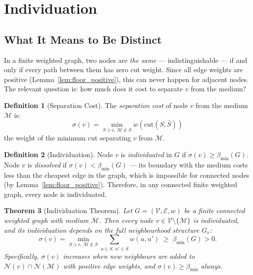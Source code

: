 \documentclass[12pt, a4paper]{article}
\theoremstyle{plain}
\newtheorem{theorem}{Theorem}[section]
\theoremstyle{definition}
\newtheorem{definition}[theorem]{Definition}
\theoremstyle{remark}
\newcommand{\cut}{\mathrm{cut}}
\newcommand{\med}{\mathcal{M}}
\newcommand{\Nbd}{\mathcal{N}}
\newcommand{\Ecal}{\mathcal{E}}
\newcommand{\Vcal}{\mathcal{V}}
\newcommand{\bmin}{\beta_{\min}}
\begin{document}
\section{Individuation}
\label{sec:individuation}

\subsection{What It Means to Be Distinct}

In a finite weighted graph, two nodes are \emph{the same} --- indistinguishable
--- if and only if every path between them has zero cut weight. Since all
edge weights are positive (Lemma~\ref{lem:floor_positive}), this can never
happen for adjacent nodes. The relevant question is: how much does it cost
to separate $v$ from the medium?

\begin{definition}[Separation Cost]
\label{def:sepcost}
The \emph{separation cost} of node $v$ from the medium $\med$ is:
\[
  \sigma(v) = \min_{S \ni v,\, \med \notin S} w(\cut(S, \bar{S}))
\]
the weight of the minimum cut separating $v$ from $\med$.
\end{definition}

\begin{definition}[Individuation]
\label{def:individuation}
Node $v$ is \emph{individuated} in $G$ if $\sigma(v) \geq \bmin(G)$.
Node $v$ is \emph{dissolved} if $\sigma(v) < \bmin(G)$ --- its boundary
with the medium costs less than the cheapest edge in the graph, which is
impossible for connected nodes (by Lemma~\ref{lem:floor_positive}). Therefore,
in any connected finite weighted graph, every node is individuated.
\end{definition}

\begin{theorem}[Individuation Theorem]
\label{thm:individuation}
Let $G = (\Vcal, \Ecal, w)$ be a finite connected weighted graph with medium
$\med$. Then every node $v \in \Vcal \setminus \{\med\}$ is individuated, and
its individuation depends on the full neighbourhood structure $G_v$:
\[
  \sigma(v) = \min_{S \ni v,\, \med \notin S} \sum_{u \in S,\, u' \in \bar{S}}
  w(u, u') \;\geq\; \bmin(G) > 0.
\]
Specifically, $\sigma(v)$ increases when new neighbours are added to $\Nbd(v)
\cap \Nbd(\med)$ with positive edge weights, and $\sigma(v) \geq \bmin$ always.
\end{theorem}
\end{document}
